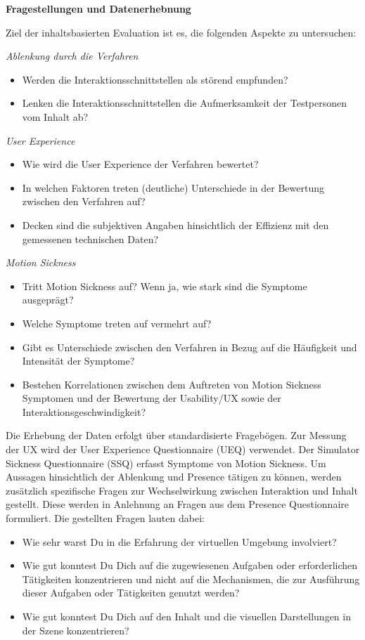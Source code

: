 \textbf{Fragestellungen und Datenerhebnung}

Ziel der inhaltsbasierten Evaluation ist es, die folgenden Aspekte zu untersuchen:

\textit{Ablenkung durch die Verfahren}
\begin{itemize}
    \item Werden die Interaktionsschnittstellen als störend empfunden?
    \item Lenken die Interaktionsschnittstellen die Aufmerksamkeit der Testpersonen vom Inhalt ab?
\end{itemize}
\textit{User Experience}
\begin{itemize}
    \item Wie wird die User Experience der Verfahren bewertet?
    \item In welchen Faktoren treten (deutliche) Unterschiede in der Bewertung zwischen den Verfahren auf? 
    \item Decken sind die subjektiven Angaben hinsichtlich der Effizienz mit den gemessenen technischen Daten?
\end{itemize}
\textit{Motion Sickness}
\begin{itemize}
    \item Tritt Motion Sickness auf? Wenn ja, wie stark sind die Symptome ausgeprägt?
    \item Welche Symptome treten auf vermehrt auf?
    \item Gibt es Unterschiede zwischen den Verfahren in Bezug auf die Häufigkeit und Intensität der Symptome?
    \item Bestehen Korrelationen zwischen dem Auftreten von Motion Sickness Symptomen und der Bewertung der Usability/UX sowie der Interaktionsgeschwindigkeit? 
\end{itemize}

Die Erhebung der Daten erfolgt über standardisierte Fragebögen. Zur Messung der UX wird der User Experience Questionnaire (UEQ) verwendet. Der Simulator Sickness Questionnaire (SSQ) erfasst Symptome von Motion Sickness. Um Aussagen hinsichtlich der Ablenkung und Presence tätigen zu können, werden zusätzlich spezifische Fragen zur Wechselwirkung zwischen Interaktion und Inhalt gestellt. Diese werden in Anlehnung an Fragen aus dem Presence Questionnaire formuliert. Die gestellten Fragen lauten dabei:

\begin{itemize}
    \item Wie sehr warst Du in die Erfahrung der virtuellen Umgebung involviert?
    \item Wie gut konntest Du Dich auf die zugewiesenen Aufgaben oder erforderlichen Tätigkeiten konzentrieren und nicht auf die Mechanismen, die zur Ausführung dieser Aufgaben oder Tätigkeiten genutzt werden?
    \item Wie gut konntest Du Dich auf den Inhalt und die visuellen Darstellungen in der Szene konzentrieren?
\end{itemize}

